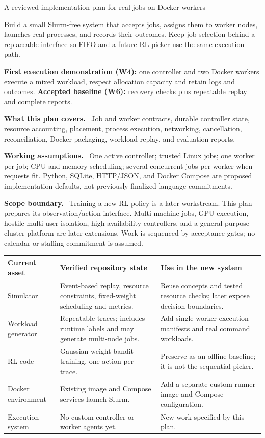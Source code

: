 \documentclass[10pt,letterpaper]{article}
\newcommand{\pagetitle}[2]{\vspace*{1pt}{\small\bfseries\color{accent}#1}\par\vspace{3pt}{\displayfont\fontsize{24}{28}\selectfont #2}\par\vspace{7pt}}
\newcommand{\lead}[1]{\par\vspace{3pt}\textbf{#1}\ }
\newcommand{\callout}[1]{\par\vspace{5pt}\begingroup\setlength{\fboxsep}{10pt}\colorbox{light}{\parbox{\dimexpr\linewidth-20pt\relax}{#1}}\endgroup\par\vspace{5pt}}
\begin{document}
\pagetitle{PURPOSE AND SCOPE}{Build the execution system first.}
{\large A reviewed implementation plan for real jobs on Docker workers}\par
\vspace{4pt}
Build a small Slurm-free system that accepts jobs, assigns them to worker nodes,
launches real processes, and records their outcomes. Keep job selection behind a
replaceable interface so FIFO and a future RL picker use the same execution path.

\callout{\textbf{First execution demonstration (W4):} one controller and two Docker workers
execute a mixed workload, respect allocation capacity and retain logs and outcomes.
\textbf{Accepted baseline (W6):} recovery checks plus repeatable replay and complete reports.}

\lead{What this plan covers.} Job and worker contracts, durable controller state,
resource accounting, placement, process execution, networking, cancellation,
reconciliation, Docker packaging, workload replay, and evaluation reports.

\lead{Working assumptions.} One active controller; trusted Linux jobs; one worker
per job; CPU and memory scheduling; several concurrent jobs per worker when requests
fit. Python, SQLite, HTTP/JSON, and Docker Compose are proposed implementation defaults,
not previously finalized language commitments.

\lead{Scope boundary.} Training a new RL policy is a later workstream. This plan prepares
its observation/action interface. Multi-machine jobs, GPU execution, hostile multi-user
isolation, high-availability controllers, and a general-purpose cluster platform are later
extensions. Work is sequenced by acceptance gates; no calendar or staffing commitment is assumed.

\vspace{5pt}
\begin{tabularx}{\linewidth}{@{}P{1.30in}YY@{}}
\toprule
\textbf{Current asset} & \textbf{Verified repository state} & \textbf{Use in the new system} \\
\midrule
Simulator & Event-based replay, resource constraints, fixed-weight scheduling and metrics. & Reuse concepts and tested resource checks; later expose decision boundaries. \\
Workload generator & Repeatable traces; includes runtime labels and may generate multi-node jobs. & Add single-worker execution manifests and real command workloads. \\
RL code & Gaussian weight-bandit training, one action per trace. & Preserve as an offline baseline; it is not the sequential picker. \\
Docker environment & Existing image and Compose services launch Slurm. & Add a separate custom-runner image and Compose configuration. \\
Execution system & No custom controller or worker agents yet. & New work specified by this plan. \\
\bottomrule
\end{tabularx}
\end{document}
